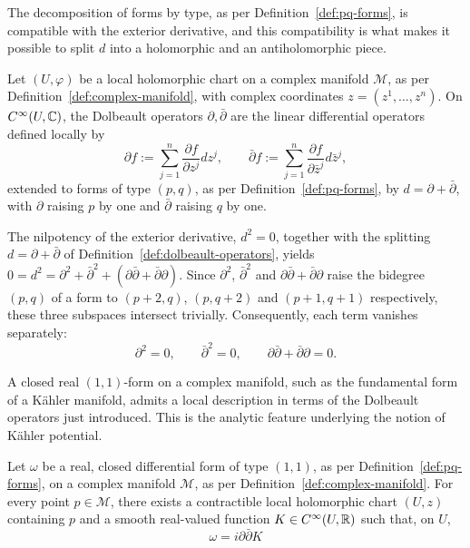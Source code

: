\noindent The decomposition of forms by type, as per Definition~\ref{def:pq-forms}, is compatible with the exterior derivative, and this compatibility is what makes it possible to split $d$ into a holomorphic and an antiholomorphic piece.

\begin{definition}
	\label{def:dolbeault-operators}
	Let $(U,\varphi)$ be a local holomorphic chart on a complex manifold
	$\mathcal{M}$, as per Definition~\ref{def:complex-manifold}, with complex
	coordinates $z=(z^1,\dots,z^n)$. On $C^\infty(U,\mathbb{C})$, the Dolbeault
	operators $\partial,\bar\partial$ are the linear differential
	operators defined locally by
	\begin{equation}
		\partial f := \sum_{j=1}^n \frac{\partial f}{\partial z^j} dz^j, \qquad \bar{\partial} f := \sum_{j=1}^n \frac{\partial f}{\partial \bar{z}^j} d\bar{z}^j,
	\end{equation}
	extended to forms of type $(p,q)$, as per Definition~\ref{def:pq-forms},
	by $d=\partial+\bar\partial$, with $\partial$ raising $p$ by one and
	$\bar\partial$ raising $q$ by one.
\end{definition}

\begin{remark}
	\label{rem:dolbeault-nilpotency}
	The nilpotency of the exterior derivative, $d^2=0$, together with the
	splitting $d=\partial+\bar\partial$ of Definition~\ref{def:dolbeault-operators},
	yields $0=d^2=\partial^2+\bar\partial^2+(\partial\bar\partial+\bar\partial\partial)$.
	Since $\partial^2$, $\bar\partial^2$ and $\partial\bar\partial+\bar\partial\partial$
	raise the bidegree $(p,q)$ of a form to $(p+2,q)$, $(p,q+2)$ and
	$(p+1,q+1)$ respectively, these three subspaces intersect trivially. Consequently, each term vanishes separately:
	\begin{equation}
		\partial^2=0, \qquad \bar\partial^2=0, \qquad \partial\bar\partial+\bar\partial\partial=0.
	\end{equation}
\end{remark}

\noindent A closed real $(1,1)$-form on a complex manifold, such as
the fundamental form of a Kähler manifold, admits a local description in terms of the Dolbeault operators just introduced. This is the analytic feature underlying the notion of Kähler potential.

\begin{theorem}
	\label{thm:ddbar-lemma}
	Let $\omega$ be a real, closed differential form of type $(1,1)$, as
	per Definition~\ref{def:pq-forms}, on a complex manifold $\mathcal{M}$, as per
	Definition~\ref{def:complex-manifold}. For every point $p \in \mathcal{M}$,
	there exists a contractible local holomorphic chart $(U, z)$
	containing $p$ and a smooth real-valued function $K \in
	C^\infty(U, \mathbb{R})$ such that, on $U$,
	\begin{equation}
		\omega = i \partial \bar{\partial} K
	\end{equation}
\end{theorem}

